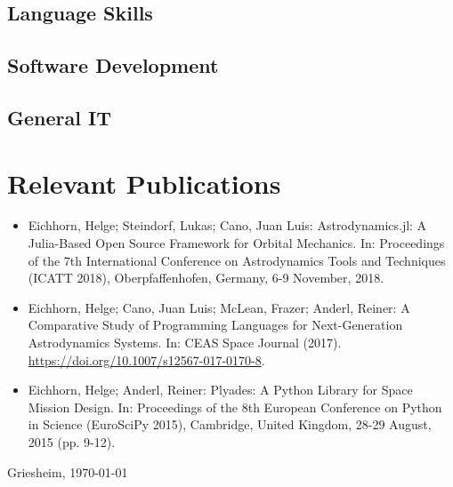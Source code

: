\documentclass[10pt,a4paper]{moderncv}
\begin{document}
\subsection{Language Skills}

\subsection{Software Development}
\subsection{General IT}

\section{Relevant Publications}
\begin{itemize}
    \item Eichhorn, Helge; Steindorf, Lukas; Cano, Juan Luis: Astrodynamics.jl: A Julia-Based Open Source Framework for Orbital Mechanics. In: Proceedings of the 7th International Conference on Astrodynamics Tools and Techniques (ICATT 2018), Oberpfaffenhofen, Germany, 6-9 November, 2018.
    \item Eichhorn, Helge; Cano, Juan Luis; McLean, Frazer; Anderl, Reiner: A Comparative Study of Programming Languages for Next-Generation Astrodynamics Systems. In: CEAS Space Journal (2017). \url{https://doi.org/10.1007/s12567-017-0170-8}.
    \item Eichhorn, Helge; Anderl, Reiner: Plyades: A Python Library for Space Mission Design. In: Proceedings of the 8th European Conference on Python in Science (EuroSciPy 2015), Cambridge, United Kingdom, 28-29 August, 2015 (pp. 9-12).
\end{itemize}
\bigskip
\bigskip
\bigskip
\bigskip
\bigskip

Griesheim, \today
\end{document}
